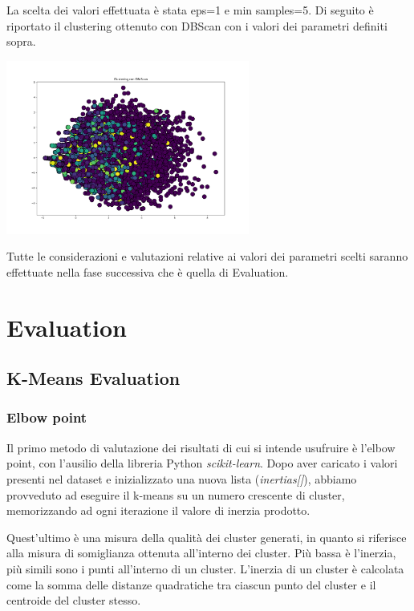 \documentclass[a4paper, 10pt]{report}
\begin{document}
                La scelta dei valori effettuata è stata eps=1 e min samples=5. Di seguito è riportato il clustering ottenuto con
                DBScan con i valori dei parametri definiti sopra.

                \begin{center}
                    \includegraphics[width=8cm]{modelling/DBScan.png}\\
                \end{center}

                Tutte le considerazioni e valutazioni relative ai valori dei parametri scelti saranno effettuate nella fase successiva
                che è quella di Evaluation.


    \chapter{Evaluation}\label{ch:evaluation}

        \section{K-Means Evaluation}\label{sec:k-means-evaluation}
            \subsection{Elbow point}
                Il primo metodo di valutazione dei risultati di cui si intende usufruire è l'elbow point, con l'ausilio della
                libreria Python \textit{scikit-learn}. Dopo aver caricato i valori presenti nel dataset e inizializzato una nuova
                lista (\textit{inertias[]}), abbiamo provveduto ad eseguire il k-means su un numero crescente di cluster, memorizzando
                ad ogni iterazione il valore di inerzia prodotto.

                Quest'ultimo è una misura della qualità dei cluster generati, in quanto si riferisce alla misura di somiglianza ottenuta
                all'interno dei cluster.
                Più bassa è l'inerzia, più simili sono i punti all'interno di un cluster.
                L'inerzia di un cluster è calcolata come la somma delle distanze quadratiche tra ciascun punto del cluster e il
                centroide del cluster stesso.
\end{document}
